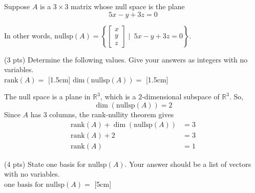 \documentclass[11pt]{article}
\begin{document}
\begin{prob}[(16 pts)]
Suppose $A$ is a $3 \times 3$ matrix whose null space is the plane
\[
5x - y + 3z = 0
\]

In other words, $\text{nullsp}(A) = \left\{ \begin{bmatrix} x \\ y \\ z \end{bmatrix} \mid \:  5x - y + 3z = 0 \right\}$.

\begin{subprob}(3 pts)
Determine the following values. Give your answers as integers with no variables. \\

$\text{rank}(A) = $ [1.5cm] \qquad $\text{dim}(\text{nullsp}(A)) = $ [1.5cm]

\begin{solution}
The null space is a plane in $\mathbb{R}^3$, which is a $2$-dimensional subspace of $\mathbb{R}^3$. So,
\[
\dim(\text{nullsp}(A)) = 2
\]
Since $A$ has 3 columns, the rank-nullity theorem gives
\begin{align*}
\text{rank}(A) + \dim(\text{nullsp}(A)) &= 3 \\
\text{rank}(A) + 2 &= 3 \\
\text{rank}(A) &= 1
\end{align*}
\end{solution}
\end{subprob}

\begin{subprob}(4 pts)
State one basis for $\text{nullsp}(A)$. Your answer should be a list of vectors with no variables. \\

$\text{one basis for }\text{nullsp}(A) = $ [5cm]


\end{subprob}
\end{prob}
\end{document}
